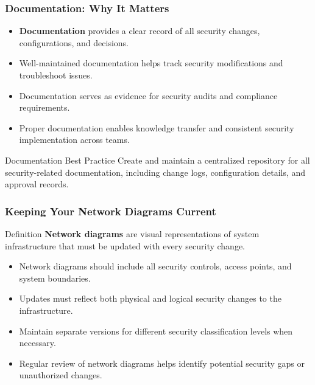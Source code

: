 \documentclass{beamer}
\begin{document}
                \begin{frame}
                \frametitle{Documentation: Why It Matters}
                \begin{itemize}
                    \item \textbf{Documentation} provides a clear record of all security changes, configurations, and decisions.
                    
                    \item Well-maintained documentation helps track security modifications and troubleshoot issues.
                    
                    \item Documentation serves as evidence for security audits and compliance requirements.
                    
                    \item Proper documentation enables knowledge transfer and consistent security implementation across teams.
                \end{itemize}
                \begin{exampleblock}{Documentation Best Practice}
                Create and maintain a centralized repository for all security-related documentation, including change logs, configuration details, and approval records.
                \end{exampleblock}
                \end{frame}

                \begin{frame}
                    \frametitle{Keeping Your Network Diagrams Current}
                    \begin{block}{Definition}
                    \textbf{Network diagrams} are visual representations of system infrastructure that must be updated with every security change.
                    \end{block}
                    \begin{itemize}
                        \item Network diagrams should include all security controls, access points, and system boundaries.
                        
                        \item Updates must reflect both physical and logical security changes to the infrastructure.
                        
                        \item Maintain separate versions for different security classification levels when necessary.
                        
                        \item Regular review of network diagrams helps identify potential security gaps or unauthorized changes.
                    \end{itemize}
                    \end{frame}
                    
\end{document}
